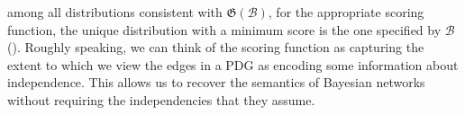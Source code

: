 \documentclass{article}
\theoremstyle{plain}
\theoremstyle{definition}
\newenvironment{example}
	{\pushQED{\qed}\renewcommand{\qedsymbol}{$\triangle$}\examplex}
	{\popQED\endexamplex%
}
\theoremstyle{remark}
\newcommand{\dg}[1]{\mathfrak{#1}}
\newcommand{\PDGof}[1]{\dg G(#1)}
\newcommand{\MN}{PDG}
\numberwithin{equation}{section}
\begin{document}
\begin{example}[emulating a BN]
        among all distributions consistent with $\PDGof{{\mathcal B}}$,
for the appropriate scoring function,
        the
        unique distribution with a minimum score is the one specified by
        ${\mathcal B}$ ().
Roughly speaking, we can think of the scoring function as capturing
the extent to which we view the edges in a PDG as encoding some
information about independence.
        This allows us to recover the semantics of Bayesian
networks without requiring the independencies that they assume.


\end{example}
\end{document}
